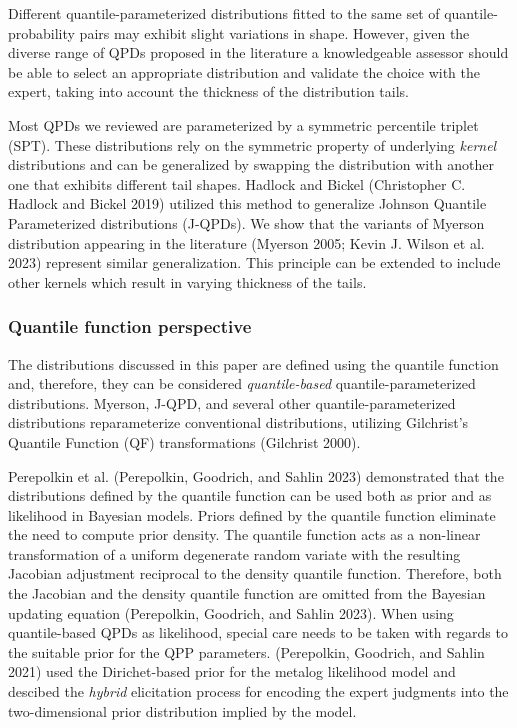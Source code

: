\documentclass[
]{interact}
\begin{document}
Different quantile-parameterized distributions fitted to the same set of
quantile-probability pairs may exhibit slight variations in shape.
However, given the diverse range of QPDs proposed in the literature a
knowledgeable assessor should be able to select an appropriate
distribution and validate the choice with the expert, taking into
account the thickness of the distribution tails.

Most QPDs we reviewed are parameterized by a symmetric percentile
triplet (SPT). These distributions rely on the symmetric property of
underlying \emph{kernel} distributions and can be generalized by
swapping the distribution with another one that exhibits different tail
shapes. Hadlock and Bickel (Christopher C. Hadlock and Bickel 2019)
utilized this method to generalize Johnson Quantile Parameterized
distributions (J-QPDs). We show that the variants of Myerson
distribution appearing in the literature (Myerson 2005; Kevin J. Wilson
et al. 2023) represent similar generalization. This principle can be
extended to include other kernels which result in varying thickness of
the tails.

\subsubsection*{Quantile function
perspective}\label{quantile-function-perspective}

The distributions discussed in this paper are defined using the quantile
function and, therefore, they can be considered \emph{quantile-based}
quantile-parameterized distributions. Myerson, J-QPD, and several other
quantile-parameterized distributions reparameterize conventional
distributions, utilizing Gilchrist's Quantile Function (QF)
transformations (Gilchrist 2000).

Perepolkin et al. (Perepolkin, Goodrich, and Sahlin 2023) demonstrated
that the distributions defined by the quantile function can be used both
as prior and as likelihood in Bayesian models. Priors defined by the
quantile function eliminate the need to compute prior density. The
quantile function acts as a non-linear transformation of a uniform
degenerate random variate with the resulting Jacobian adjustment
reciprocal to the density quantile function. Therefore, both the
Jacobian and the density quantile function are omitted from the Bayesian
updating equation (Perepolkin, Goodrich, and Sahlin 2023). When using
quantile-based QPDs as likelihood, special care needs to be taken with
regards to the suitable prior for the QPP parameters. (Perepolkin,
Goodrich, and Sahlin 2021) used the Dirichet-based prior for the metalog
likelihood model and descibed the \emph{hybrid} elicitation process for
encoding the expert judgments into the two-dimensional prior
distribution implied by the model.
\end{document}
